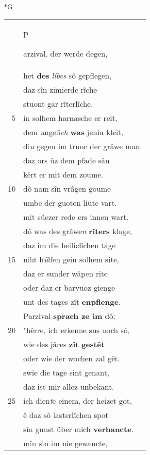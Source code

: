\documentclass[8pt,a4paper,notitlepage]{article}
\begin{document}
\begin{table}[ht]
\begin{minipage}[t]{0.5\linewidth}
\small
\begin{center}*G
\end{center}
\begin{tabular}{rl}
 & \begin{large}P\end{large}arzival, der werde degen,\\ 
 & het \textbf{des} \textit{lîbes} sô gepflegen,\\ 
 & daz sîn zimierde rîche\\ 
 & stuont gar rîterlîche.\\ 
5 & in solhem harnasche er reit,\\ 
 & dem \textit{u}ngelî\textit{ch} \textbf{was} jeniu kleit,\\ 
 & di\textit{u} gegen im truoc der grâwe man.\\ 
 & daz ors ûz dem pfade sân\\ 
 & kêrt er mit dem zoume.\\ 
10 & dô nam sîn vrâgen goume\\ 
 & umbe der guoten liute vart.\\ 
 & mit süezer rede ers innen wart.\\ 
 & dô was des grâwe\textit{n} \textbf{rîters} klage,\\ 
 & daz im die heiliclîchen tage\\ 
15 & niht h\textit{ü}lfen gein solhem site,\\ 
 & daz er sunder wâpen rite\\ 
 & oder daz er barvuoz gienge\\ 
 & unt des tages zît \textbf{enpfienge}.\\ 
 & Parzival \textbf{sprach ze im} dô:\\ 
20 & "hêrre, ich erkenne sus noch sô,\\ 
 & wie des jâres \textbf{zît} \textbf{gestêt}\\ 
 & oder wie der wochen zal gêt.\\ 
 & swie die tage sint genant,\\ 
 & daz ist mir allez unbekant.\\ 
25 & ich dien\textit{t}e einem, der heizet got,\\ 
 & ê daz sô lasterlîchen spot\\ 
 & sîn gunst über mich \textbf{verhancte}.\\ 
 & mîn sin im nie gewancte,\\ 

\end{tabular}
\end{minipage}
\end{table}
\end{document}
